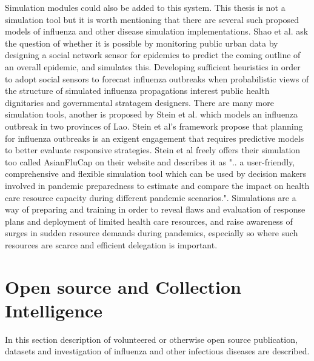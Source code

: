 Simulation modules could also be added to this system. This thesis is not a simulation tool but it is worth mentioning that there are several such proposed models of influenza and other disease simulation implementations. Shao et al. \cite{shao2016forecasting} ask the question of whether it is possible by monitoring public urban data by designing a social network sensor for epidemics to predict the coming outline of an overall epidemic, and simulates this. Developing sufficient heuristics in order to adopt social sensors to forecast influenza outbreaks when probabilistic views of the structure of simulated influenza propagations interest public health dignitaries and governmental stratagem designers. There are many more simulation tools, another is proposed by Stein et al. \cite{stein2012development} which models an influenza outbreak in two provinces of Lao. Stein et al's framework propose that planning for influenza outbreaks is an exigent engagement that requires predictive models to better evaluate responsive strategies. Stein et al freely offers their simulation too called AsianFluCap on their website and describes it as ".. a user-friendly, comprehensive and flexible simulation tool which can be used by decision makers involved in pandemic preparedness to estimate and compare the impact on health care resource capacity during different pandemic scenarios.". Simulations are a way of preparing and training in order to reveal flaws and evaluation of response plans and deployment of limited health care resources, and raise awareness of surges in sudden resource demands during pandemics, especially so where such resources are scarce and efficient delegation is important.


\section{Open source and Collection Intelligence}
In this section description of volunteered or otherwise open source publication, datasets and investigation of influenza and other infectious diseases are described.

